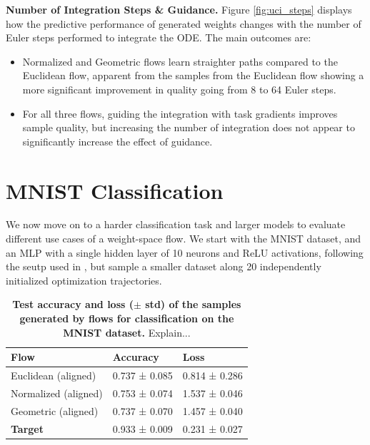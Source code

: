 \textbf{Number of Integration Steps \& Guidance.} Figure \ref{fig:uci_steps} displays how the predictive performance of generated weights changes with the number of Euler steps performed to integrate the ODE. The main outcomes are:
\begin{itemize}
    \item Normalized and Geometric flows learn straighter paths compared to the Euclidean flow, apparent from the samples from the Euclidean flow showing a more significant improvement in quality going from 8 to 64 Euler steps. 
    \item For all three flows, guiding the integration with task gradients improves sample quality, but increasing the number of integration does not appear to significantly increase the effect of guidance. 
\end{itemize}


\section{MNIST Classification} \label{sec:mnist_classification}

We now move on to a harder classification task and larger models to evaluate different use cases of a weight-space flow. We start with the MNIST dataset, and an MLP with a single hidden layer of 10 neurons and ReLU activations, following the seutp used in \citep{peeblesLearningLearnGenerative2022}, but sample a smaller dataset along 20 independently initialized optimization trajectories.

\begin{table}[t!]
    \centering
    \begin{tabular}{lll}
        \toprule
        \textbf{Flow}  & \textbf{Accuracy} & \textbf{Loss} \\
        \midrule 
        Euclidean (aligned)         & 0.737 ± 0.085	& 0.814 ± 0.286 \\
        \midrule
        Normalized (aligned)        & 0.753 ± 0.074	& 1.537 ± 0.046 \\
        \midrule
        Geometric (aligned)         & 0.737 ± 0.070	& 1.457 ± 0.040 \\
        \midrule
        \textbf{Target}             & 0.933 ± 0.009 & 0.231 ± 0.027 \\
        \bottomrule
    \end{tabular}
    \caption{\label{tab:mnist_class_table}\textbf{Test accuracy and loss ($\pm$ std) of the samples generated by flows for classification on the MNIST dataset.} {\color{orange}Explain...}}
\end{table}

